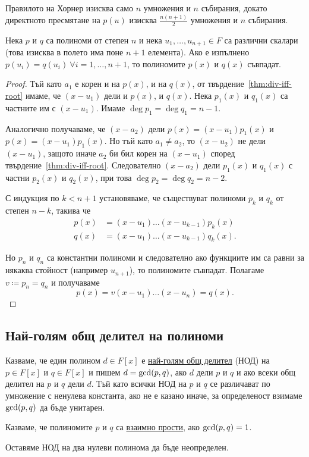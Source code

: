 \documentclass[numbers=endperiod, DIV=15, bibliography=totocnumbered]{scrartcl}
\begin{document}
Правилото на Хорнер изисква само $n$ умножения и $n$ събирания, докато директното пресмятане на $p(u)$ изисква $\frac {n(n+1)} 2$ умножения и $n$ събирания.

\begin{theorem}\label{thm:coeff-principle}
  Нека $p$ и $q$ са полиноми от степен $n$ и нека $u_1, \ldots, u_{n+1} \in F$ са различни скалари (това изисква в полето има поне $n+1$ елемента). Ако е изпълнено $p(u_i) = q(u_i)~\forall i = 1, \ldots, n + 1$, то полиномите $p(x)$ и $q(x)$ съвпадат.
\end{theorem}
\begin{proof}
  Тъй като $a_1$ е корен и на $p(x)$, и на $q(x)$, от твърдение~\ref{thm:div-iff-root} имаме, че $(x - u_1)$ дели и $p(x)$, и $q(x)$. Нека $p_1(x)$ и $q_1(x)$ са частните им с $(x - u_1)$. Имаме $\deg p_1 = \deg q_1 = n - 1$.

  Аналогично получаваме, че $(x - a_2)$ дели $p(x) = (x - u_1) p_1(x)$ и $p(x) = (x - u_1) p_1(x)$. Но тъй като $a_1 \neq a_2$, то $(x - u_2)$ не дели $(x - u_1)$, защото иначе $a_2$ би бил корен на $(x - u_1)$ според твърдение~\ref{thm:div-iff-root}. Следователно $(x - a_2)$ дели $p_1(x)$ и $q_1(x)$ с частни $p_2(x)$ и $q_2(x)$, при това $\deg p_2 = \deg q_2 = n - 2$.

  С индукция по $k < n + 1$ установяваме, че съществуват полиноми $p_k$ и $q_k$ от степен $n - k$, такива че
  \begin{align*}
    p(x) &= (x - u_1) \ldots (x - u_{k-1}) p_k(x) \\
    q(x) &= (x - u_1) \ldots (x - u_{k-1}) q_k(x).
  \end{align*}

  Но $p_n$ и $q_n$ са константни полиноми и следователно ако функциите им са равни за някаква стойност (например $u_{n+1}$), то полиномите съвпадат. Полагаме $v \coloneqq p_n = q_n$ и получаваме
  \begin{displaymath}
    p(x) = v (x - u_1) \ldots (x - u_n) = q(x).
  \end{displaymath}
\end{proof}

\subsection{Най-голям общ делител на полиноми}

\begin{definition}
  Казваме, че един полином $d \in F[x]$ е \uline{най-голям общ делител} (НОД) на $p \in F[x]$ и $q \in F[x]$ и пишем $d = \operatorname{gcd}(p, q)$, ако $d$ дели $p$ и $q$ и ако всеки общ делител на $p$ и $q$ дели $d$. Тъй като всички НОД на $p$ и $q$ се различават по умножение с ненулева константа, ако не е казано иначе, за определеност взимаме $\operatorname{gcd}(p, q)$ да бъде унитарен.

  Казваме, че полиномите $p$ и $q$ са \uline{взаимно прости}, ако $\operatorname{gcd}(p, q) = 1$.

  Оставяме НОД на два нулеви полинома да бъде неопределен.
\end{definition}
\end{document}
